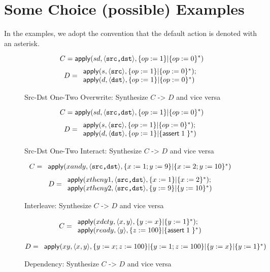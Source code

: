 \section{Some Choice (possible) Examples}

In the examples, we adopt the convention that the default action is
denoted with an asterisk.

\begin{figure}
  \[C = \mathsf{apply}(sd, \langle\texttt{src,dst}\rangle, \{op := 1\} | \{op:=0\}^*)\]
  \[D = \begin{array}{l}
  \mathsf{apply}(s, \langle\texttt{src}\rangle, \{op:=1\} | \{op:=0\}^*);
  \\ \mathsf{apply}(d, \langle\texttt{dst}\rangle, \{op:=1\} | \{op := 0\}^*)
  \end{array}\]
  \caption{Src-Dst One-Two Overwrite: Synthesize $C$ -> $D$ and vice versa}
\end{figure}

\begin{figure}
  \[C = \mathsf{apply}(sd, \langle\texttt{src,dst}\rangle, \{op := 1\} | \{op:=0\}^*)\]
  \[D = \begin{array}{l}
    \mathsf{apply}(s, \langle\texttt{src}\rangle, \{op:=1\} | \{op:=0\}^*);
    \\ \mathsf{apply}(d, \langle\texttt{dst}\rangle, \{op:=1\} | \{\mathsf{assert}\; 1\;\}^*)
  \end{array}\]
  \caption{Src-Dst One-Two Interact: Synthesize $C$ -> $D$ and vice versa}
\end{figure}

\begin{figure}
  \[C = \begin{array}l
    \apply{xandy, \langle\texttt{src,dst}\rangle, \{x := 1; y:= 9\} | \{x:= 2; y:=10\}^*} \\
  \end{array}
  \]
  \[D = \begin{array}{l}
    \mathsf{apply}(xtheny1, \langle\texttt{src,dst}\rangle, \{x:=1\} | \{x:=2\}^*);
    \\ \mathsf{apply}(xtheny2, \langle\texttt{src,dst}\rangle, \{y:=9\} | \{y:=10\}^*)
  \end{array}\]
  \caption{Interleave: Synthesize $C$ -> $D$ and vice versa}
\end{figure}


\begin{figure}
  \[C = \begin{array}l
    \apply{xdety, \langle x,y \rangle, \{y:=x\} | \{y:= 1\}^*}; \\
    \apply{ready, \langle y \rangle, \{z := 100\} | \{\assert \TRUE\}^*}
  \end{array}\]

  \[D = \begin{array}l
    \apply{xy, \langle x, y \rangle, \{y:= x;z:= 100\} | \{y:=1; z:=100\} | \{y:= x\} | \{y:=1\}^*}
    \end{array}\]
  
  \caption{Dependency: Synthesize $C$ -> $D$ and vice versa}
\end{figure}

